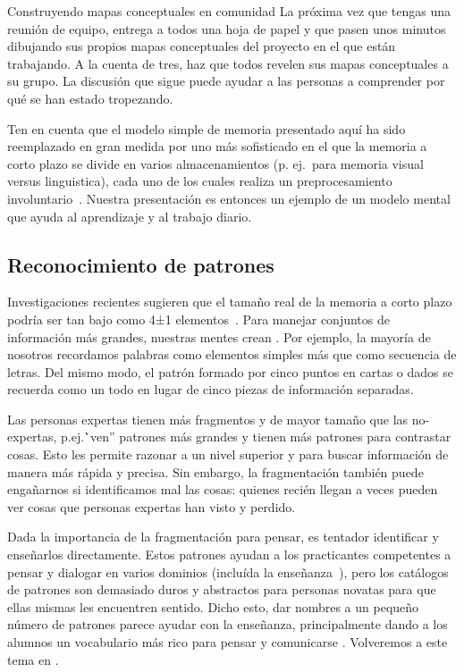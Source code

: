 
\begin{aside}{Construyendo mapas conceptuales en comunidad}
 La próxima vez que tengas una reunión de equipo,
 entrega a todos una hoja de papel
 y que pasen unos minutos dibujando sus propios mapas conceptuales del proyecto en el que  están trabajando.
  A la cuenta de tres,
  haz que todos revelen sus mapas conceptuales a su grupo.
  La discusión que sigue puede ayudar a las personas a comprender
  por qué se han estado tropezando.
\end{aside}

Ten en cuenta que el modelo simple de memoria presentado aquí ha sido reemplazado en gran medida por uno más sofisticado
en el que la memoria a corto plazo se divide en varios almacenamientos
(p. ej.\ para memoria visual versus linguistica),
cada uno de los cuales realiza un preprocesamiento involuntario~\cite{Mill2016a}.
Nuestra presentación es entonces un ejemplo de un modelo mental que ayuda al aprendizaje y al trabajo diario.

\subsection*{Reconocimiento de patrones}

Investigaciones recientes sugieren que el tamaño real de la memoria a corto plazo 
podría ser tan bajo como 4±1 elementos~\cite{Dida2016}.
Para manejar conjuntos de información más grandes,
nuestras mentes crean .
Por ejemplo,
la mayoría de nosotros recordamos palabras como elementos simples más que como secuencia de letras.
Del mismo modo,
el patrón formado por cinco puntos en cartas o dados se recuerda como un todo 
en lugar de cinco piezas de información separadas.

Las personas expertas tienen más fragmentos y de mayor tamaño que las no-expertas,
p.ej.\``ven'' patrones más grandes y tienen más patrones para contrastar cosas.
Esto les permite razonar a un nivel superior
y para buscar información de manera más rápida y precisa.
Sin embargo,
la fragmentación también puede engañarnos si identificamos mal las cosas:
quienes recién llegan a veces pueden ver cosas que personas expertas han visto y perdido.

Dada la importancia de la fragmentación para pensar,
es tentador identificar 
y enseñarlos directamente.
Estos patrones ayudan a los practicantes competentes a pensar y dialogar en varios dominios (incluída la enseñanza~\cite{Berg2012}),
pero los catálogos de patrones son demasiado duros y abstractos para personas novatas para que ellas mismas les encuentren sentido.
Dicho esto,
dar nombres a un pequeño número de patrones parece ayudar con la enseñanza,
principalmente dando a los alumnos un vocabulario más rico para pensar y comunicarse \cite{Kuit2004,Byck2005,Saja2006}.
Volveremos a este tema en .

